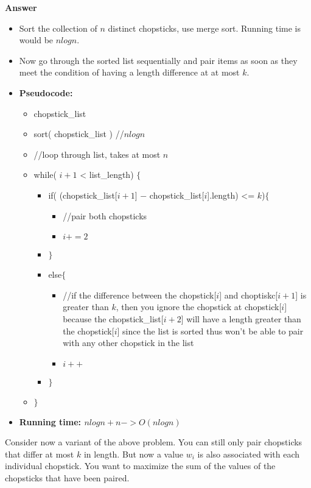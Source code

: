 \documentclass{article}
\begin{document}
\textbf{ Answer }
\begin{itemize}
\item Sort the collection of $n$ distinct chopsticks, use merge sort. Running time is would be $nlogn$. 
\item Now go through the sorted list sequentially and pair items as soon as they meet the condition of having a length difference at at most $k$.

\item {\bf Pseudocode: }
\begin{itemize}
\item chopstick\_list
\item sort( chopstick\_list ) //$nlogn$
\item //loop through list, takes at most $n$
\item while( $i+1$ < list\_length) $\{$
\begin{itemize}
\item if( (chopstick\_list[$i+1$] $-$ chopstick\_list[$i$].length) <= $k$)$\{$
\begin{itemize}
\item //pair both chopsticks
\item $i+=2$
\end{itemize}
\item $\}$
\item else$\{$
\begin{itemize}
\item //if the difference between the chopstick[$i$] and choptiskc[$i+1$] is greater than $k$, then you ignore the chopstick at chopstick[$i$] because the chopstick\_list[$i+2$] will have a length greater than the chopstick[$i$] since the list is sorted thus won’t be able to pair with any other chopstick in the list
\item $i++$
\end{itemize}
\item $\}$
\end{itemize}
\item $\}$
\end{itemize}
\item {\bf Running time: $nlogn + n -> O(nlogn)$ }
\end{itemize}

 Consider now a variant of the above problem. You
can still only pair chopsticks that differ at most $k$ in length. But
now a value $w_{i}$ is also associated with each individual
chopstick. You want to maximize the sum of the values of the
chopsticks that have been paired.\\
\end{document}
